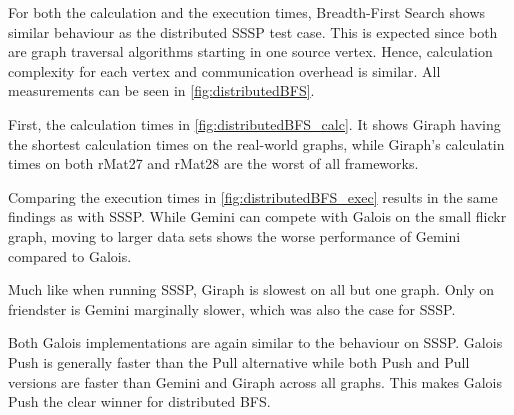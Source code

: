For both the calculation and the execution times, Breadth-First Search shows similar behaviour as the distributed SSSP test case. This is expected since both are graph traversal algorithms starting in one source vertex.
Hence, calculation complexity for each vertex and communication overhead is similar.
All measurements can be seen in \autoref{fig:distributedBFS}.

First, the calculation times in \autoref{fig:distributedBFS_calc}. It shows Giraph having the shortest calculation times on the real-world graphs, while Giraph's calculatin times on both rMat27 and rMat28 are the worst of all frameworks.

Comparing the execution times in \autoref{fig:distributedBFS_exec} results in the same findings as with SSSP.
While Gemini can compete with Galois on the small flickr graph, moving to larger data sets shows the worse performance of Gemini compared to Galois.

Much like when running SSSP, Giraph is slowest on all but one graph. Only on friendster is Gemini marginally slower, which was also the case for SSSP.

Both Galois implementations are again similar to the behaviour on SSSP.
Galois Push is generally faster than the Pull alternative while both Push and Pull versions are faster than Gemini and Giraph across all graphs.
This makes Galois Push the clear winner for distributed BFS.

